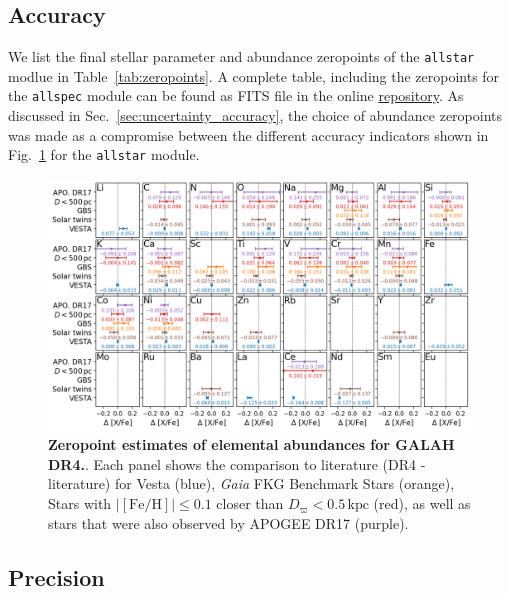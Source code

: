 \documentclass[
  journal=pasa,
  manuscript=research-paper, %
  year=2024,
  volume=37
]{cup-journal}
\newcommand{\Gaia}{\textit{Gaia}\xspace}
\begin{document}
\subsection{Accuracy}

We list the final stellar parameter and abundance zeropoints of the \texttt{allstar} modlue in Table~\ref{tab:zeropoints}. A complete table, including the zeropoints for the \texttt{allspec} module can be found as FITS file in the online \href{https://github.com/svenbuder/GALAH_DR4/blob/main/catalogs/galah_dr4_zeropoints_240705.fits}{repository}. As discussed in Sec.~\ref{sec:uncertainty_accuracy}, the choice of abundance zeropoints was made as a compromise between the different accuracy indicators shown in Fig.~\ref{fig:galah_dr4_zeropoint_checks_allstar} for the \texttt{allstar} module.



\begin{figure}[ht]
 \centering
 \includegraphics[width=\textwidth]{figures/galah_dr4_zeropoint_checks_allstar.png}
 \caption{\textbf{Zeropoint estimates of elemental abundances for GALAH DR4.}. Each panel shows the comparison to literature (DR4 - literature) for Vesta (blue), \Gaia FKG Benchmark Stars (orange), Stars with $\vert \mathrm{[Fe/H]} \vert \leq 0.1$ closer than $D_\varpi < 0.5\,\mathrm{kpc}$ (red), as well as stars that were also observed by APOGEE DR17 (purple).}
 \label{fig:galah_dr4_zeropoint_checks_allstar}
\end{figure}

\subsection{Precision}
\end{document}
